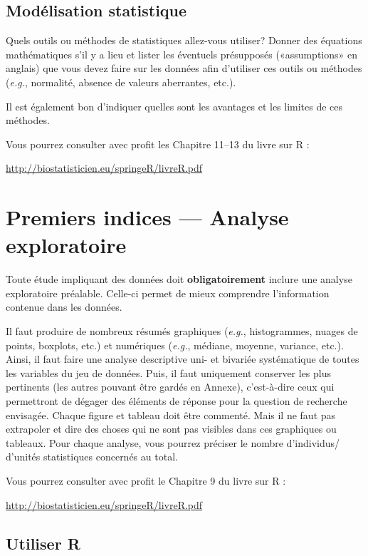 \documentclass[mstat,12pt]{unswthesis}
\begin{document}
\section{Modélisation statistique}\label{moduxe9lisation-statistique}

Quels outils ou méthodes de statistiques allez-vous utiliser? Donner des
équations mathématiques s'il y a lieu et lister les éventuels
présupposés («assumptions» en anglais) que vous devez faire sur les
données afin d'utiliser ces outils ou méthodes (\emph{e.g.}, normalité,
absence de valeurs aberrantes, etc.).

Il est également bon d'indiquer quelles sont les avantages et les
limites de ces méthodes.

Vous pourrez consulter avec profit les Chapitre 11--13 du livre sur R :

\url{http://biostatisticien.eu/springeR/livreR.pdf}

\chapter{Premiers indices --- Analyse
exploratoire}\label{premiers-indices-analyse-exploratoire}

Toute étude impliquant des données doit \textbf{obligatoirement} inclure
une analyse exploratoire préalable. Celle-ci permet de mieux comprendre
l'information contenue dans les données.

Il faut produire de nombreux résumés graphiques (\emph{e.g.},
histogrammes, nuages de points, boxplots, etc.) et numériques
(\emph{e.g.}, médiane, moyenne, variance, etc.). Ainsi, il faut faire
une analyse descriptive uni- et bivariée systématique de toutes les
variables du jeu de données. Puis, il faut uniquement conserver les plus
pertinents (les autres pouvant être gardés en Annexe), c'est-à-dire ceux
qui permettront de dégager des éléments de réponse pour la question de
recherche envisagée. Chaque figure et tableau doit être commenté. Mais
il ne faut pas extrapoler et dire des choses qui ne sont pas visibles
dans ces graphiques ou tableaux. Pour chaque analyse, vous pourrez
préciser le nombre d'individus/ d'unités statistiques concernés au
total.

Vous pourrez consulter avec profit le Chapitre 9 du livre sur R :

\url{http://biostatisticien.eu/springeR/livreR.pdf}

\section{Utiliser R}\label{utiliser-r}
\end{document}
